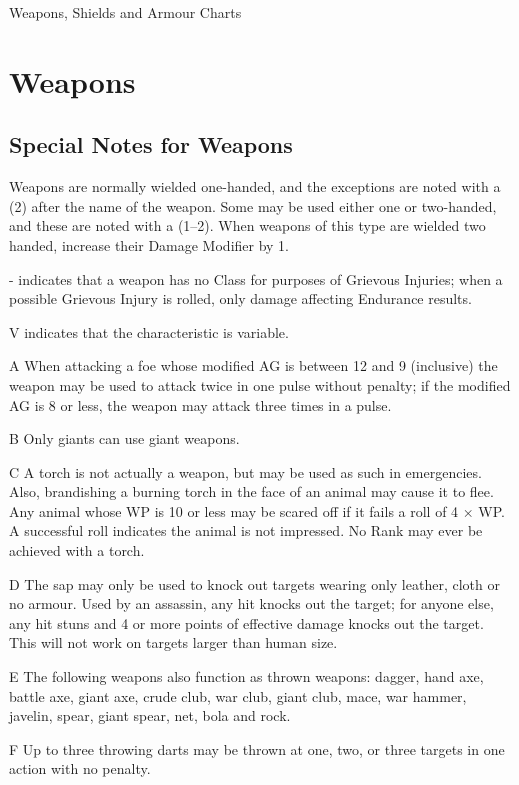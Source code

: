 \begin{Table}{Weapons, Shields and Armour Charts}

\section{Weapons}

\subsection{Special Notes for Weapons}

 

Weapons  are  normally  wielded  one-handed,  and 
the  exceptions are  noted  with  a  (2)  after  the  name 
of  the  weapon.  Some  may  be  used  either  one  or 
two-handed,  and  these  are  noted  with  a  (1–2). 
When  weapons  of  this  type  are  wielded  two 
handed, increase their Damage Modifier by 1. 

- indicates that a weapon has no Class for purposes of Grievous
Injuries; when a possible Grievous Injury is rolled, only damage
affecting Endurance results.

V indicates that the characteristic is variable. 

A When attacking a foe whose modified AG is between 12 and 9
(inclusive) the weapon may be used to attack twice in one pulse
without penalty; if the modified AG is 8 or less, the weapon may
attack three times in a pulse.

B Only giants can use giant weapons. 

C A torch is not actually a weapon, but may be used as such in
emergencies.  Also, brandishing a burning torch in the face of an
animal may cause it to flee. Any animal whose WP is 10 or less may be
scared off if it fails a roll of 4 × WP.  A successful roll indicates
the animal is not impressed. No Rank may ever be achieved with a
torch.

D The sap may only be used to knock out targets wearing only leather,
cloth or no armour. Used by an assassin, any hit knocks out the
target; for anyone else, any hit stuns and 4 or more points of
effective damage knocks out the target.  This will not work on targets
larger than human size.

E The following weapons also function as thrown weapons: dagger, hand
axe, battle axe, giant axe, crude club, war club, giant club, mace,
war hammer, javelin, spear, giant spear, net, bola and rock.

F Up to three throwing darts may be thrown at one, 
two, or three targets in one action with no penalty. 


\end{Table}
